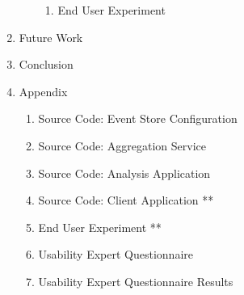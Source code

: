 \begin{enumerate}[noitemsep,label=\arabic*.]
\begin{enumerate}[noitemsep,label=\arabic*.]
\begin{enumerate}[noitemsep,label=\arabic*.]
		\item End User Experiment
		\end{enumerate}	
	\end{enumerate}
\item Future Work
\item Conclusion
\item Appendix
	\begin{enumerate}[noitemsep,label=\arabic*.]
	\item Source Code: Event Store Configuration
	\item Source Code: Aggregation Service
	\item Source Code: Analysis Application
	\item Source Code: Client Application **
	\item End User Experiment **
	\item Usability Expert Questionnaire
	\item Usability Expert Questionnaire Results
	\end{enumerate}
\end{enumerate}
